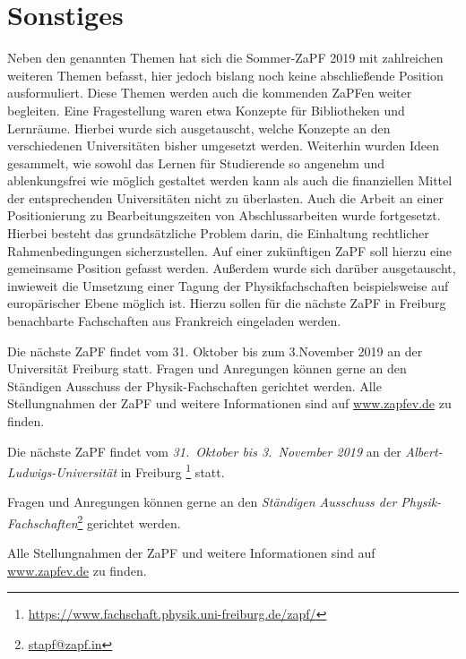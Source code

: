 \section*{Sonstiges}
Neben den genannten Themen hat sich die Sommer-ZaPF 2019 mit zahlreichen weiteren Themen befasst, hier jedoch bislang noch keine abschließende Position ausformuliert. Diese Themen werden auch die kommenden ZaPFen weiter begleiten. 
Eine Fragestellung waren etwa Konzepte für Bibliotheken und Lernräume. Hierbei wurde sich ausgetauscht, welche Konzepte an den verschiedenen Universitäten bisher umgesetzt werden. Weiterhin wurden Ideen gesammelt, wie sowohl das Lernen für Studierende so angenehm und ablenkungsfrei wie möglich gestaltet werden kann als auch die finanziellen Mittel der entsprechenden Universitäten nicht zu überlasten. 
Auch die Arbeit an einer Positionierung zu Bearbeitungszeiten von Abschlussarbeiten wurde fortgesetzt. Hierbei besteht das grundsätzliche Problem darin, die Einhaltung rechtlicher Rahmenbedingungen sicherzustellen. Auf einer zukünftigen ZaPF soll hierzu eine gemeinsame Position gefasst werden.
Außerdem wurde sich darüber ausgetauscht, inwieweit die Umsetzung einer Tagung der Physikfachschaften beispielsweise auf europärischer Ebene möglich ist. Hierzu sollen für die nächste ZaPF in Freiburg benachbarte Fachschaften aus Frankreich eingeladen werden. 

Die nächste ZaPF findet vom 31. Oktober bis zum  3.November 2019 an der Universität Freiburg statt. Fragen und Anregungen können gerne an den Ständigen Ausschuss der Physik-Fachschaften gerichtet werden. Alle Stellungnahmen der ZaPF und weitere Informationen sind auf \url{www.zapfev.de} zu finden. 

		
\vfill
		
Die nächste ZaPF findet vom \emph{31.\ Oktober bis 3.\ November 2019} an der  \emph{Albert-Ludwigs-Universität} in Freiburg \footnote{\url{https://www.fachschaft.physik.uni-freiburg.de/zapf/}} statt.
		
Fragen und Anregungen können gerne an den \emph{Ständigen Ausschuss der Physik-Fachschaften}\footnote{\href{mailto:stapf@zapf.in}{\url{stapf@zapf.in}}} gerichtet werden.
		
Alle Stellungnahmen der ZaPF und weitere Informationen sind auf \href{http://www.zapfev.de}{\url{www.zapfev.de}} zu finden.
		
		
		
		
